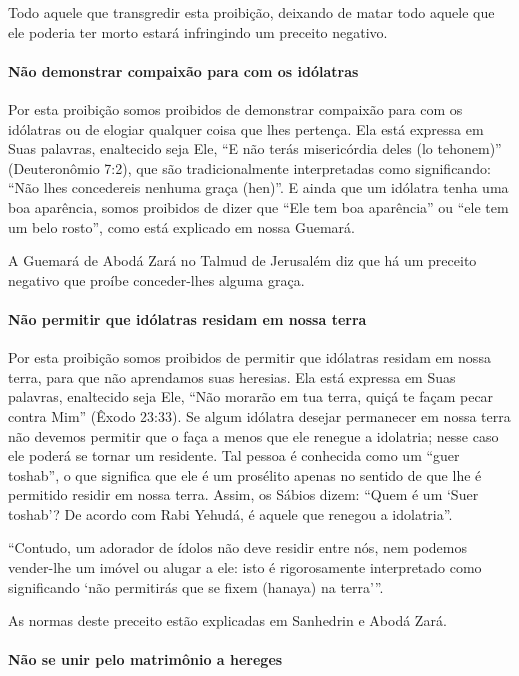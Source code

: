Todo aquele que transgredir esta proibição, deixando de matar todo
aquele que ele poderia ter morto estará infringindo um preceito
negativo.

\paragraph{Não demonstrar compaixão para com os idólatras}

Por esta proibição somos proibidos de demonstrar compaixão para com os
idólatras ou de elogiar qualquer coisa que lhes pertença. Ela está
expressa em Suas palavras, enaltecido seja Ele, ``E não terás
misericórdia deles (lo tehonem)'' (Deuteronômio 7:2), que são
tradicionalmente interpretadas como significando: ``Não lhes
concedereis nenhuma graça (hen)''. E ainda que um idólatra tenha uma boa
aparência, somos proibidos de dizer que ``Ele tem boa aparência'' ou
``ele tem um belo rosto'', como está explicado em nossa Guemará.

A Guemará de Abodá Zará no Talmud de Jerusalém diz que há um preceito
negativo que proíbe conceder-lhes alguma graça.

\paragraph{Não permitir que idólatras residam em nossa terra}

Por esta proibição somos proibidos de permitir que idólatras residam em
nossa terra, para que não aprendamos suas heresias. Ela está expressa em
Suas palavras, enaltecido seja Ele, ``Não morarão em tua terra, quiçá te
façam pecar contra Mim'' (Êxodo 23:33). Se algum idólatra desejar
permanecer em nossa terra não devemos permitir que o faça a menos que
ele renegue a idolatria; nesse caso ele poderá se tornar um residente.
Tal pessoa é conhecida como um ``guer toshab'', o que significa que ele
é um prosélito apenas no sentido de que lhe é permitido residir em
nossa terra. Assim, os Sábios dizem: ``Quem é um `Suer toshab'? De
acordo com Rabi Yehudá, é aquele que renegou a idolatria''.

``Contudo, um adorador de ídolos não deve residir entre nós, nem podemos
vender-lhe um imóvel ou alugar a ele: isto é rigorosamente interpretado
como significando `não permitirás que se fixem (hanaya) na terra'''.

As normas deste preceito estão explicadas em Sanhedrin e Abodá Zará.

\paragraph{Não se unir pelo matrimônio a hereges}

